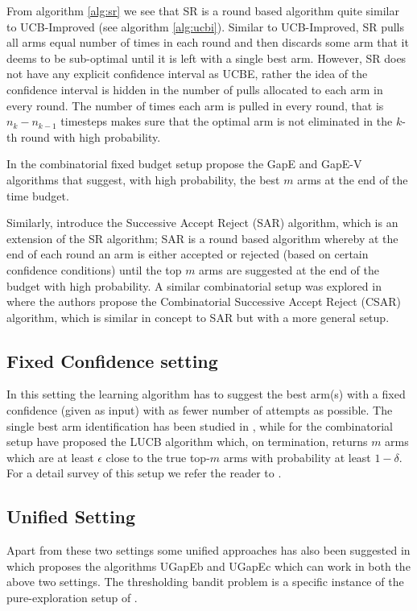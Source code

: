 From algorithm \ref{alg:sr} we see that SR is a round based algorithm quite similar to UCB-Improved (see algorithm \ref{alg:ucbi}). Similar to UCB-Improved, SR pulls all arms equal number of times in each round and then discards some arm that it deems to be sub-optimal until it is left with a single best arm. However, SR does not have any explicit confidence interval as UCBE, rather the idea of the confidence interval is hidden in the number of pulls allocated to each arm in every round. The number of times each arm is pulled in every round, that is $n_k - n_{k-1}$ timesteps makes sure that the optimal arm is not eliminated in the $k$-th round with high probability. 

In the combinatorial fixed budget setup \citet{gabillon2011multi} propose the GapE and GapE-V algorithms that suggest, with high probability, the best $m$ arms at the end of the time budget. 

Similarly, \citet{bubeck2013multiple} introduce the  Successive Accept Reject (SAR) algorithm, which is an extension of the SR algorithm; SAR is a round based algorithm whereby at the end of each round an arm is either accepted or rejected (based on certain confidence conditions) until the top $m$ arms are suggested at the end of the budget with high probability. A similar combinatorial setup was explored in \citet{chen2014combinatorial} where the authors propose the Combinatorial Successive Accept Reject (CSAR) algorithm, which is similar in concept to SAR but with a more general setup. 

\subsection{Fixed Confidence setting} 

In this setting the learning algorithm has to suggest the best arm(s) with a fixed confidence (given as input) with as fewer number of attempts as possible. The single best arm identification has been studied in \citet{even2006action}, while for the combinatorial setup \citet{kalyanakrishnan2012pac} have proposed the LUCB algorithm which, on termination, returns  $m$ arms which are at least $\epsilon$ close to the true top-$m$ arms with probability at least $1-\delta$. For a detail survey of this setup we refer the reader to \citet{jamieson2014best}. 

\subsection{Unified Setting}
Apart from these two settings some unified approaches has also been suggested in \citet{gabillon2012best} which proposes the algorithms UGapEb and UGapEc which can work in both the above two settings. The thresholding bandit problem is a specific instance of the pure-exploration setup of \citet{chen2014combinatorial}. 



	
	
